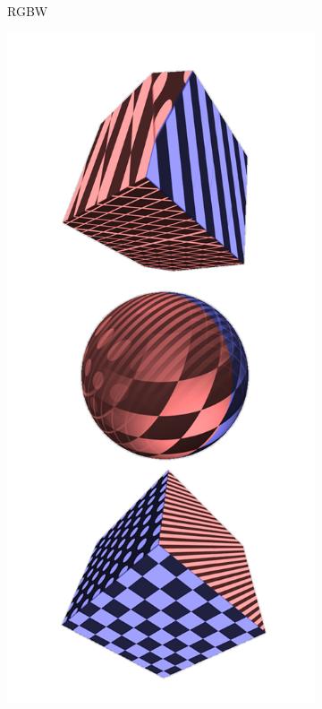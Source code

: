 \documentclass{l4proj}
\begin{document}
\begin{figure}[H]
\begin{subfigure}[b]{0.32\textwidth}
    \caption{
      RGBW
    }
    \label{fig:tex1}
  \end{subfigure}
  \begin{subfigure}[b]{0.32\textwidth}
    \includegraphics[width=\textwidth]{images/textures/pattern-direction.png}

\end{subfigure}
\end{figure}
\end{document}

